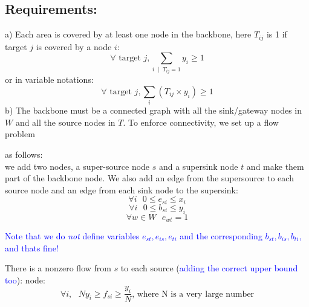 \documentclass[letterpaper, 12pt]{article}
\newcommand{\blue}[1]{\textcolor{blue}{#1}}
\begin{document}
\subsection*{Requirements: }a) Each area is covered by at least one node in the
backbone, here $T_{ij}$ is 1 if target $j$ is covered by a node $i$:
\begin{equation}
	\forall \mbox{ target }j,    \sum_{i \; \mid \; T_{ij} = 1}   y_i   \geq   1
\end{equation}
or in variable notations:
\begin{equation*}
	\forall \mbox{ target }j,    \sum_i   (T_{ij} \times y_i)   \geq   1
\end{equation*}
b) The backbone must be a connected graph with all the sink/gateway nodes in $W$
and all the source nodes in $T$. To enforce connectivity, we set up a flow problem

as follows: \\
\indent we add two nodes, a super-source node $s$ and a supersink node $t$
and make them part of the backbone node. We also add an edge from the supersource to
each source node and an edge from each sink node to the supersink:
\begin{equation}
	\forall i\mbox{ } 0 \leq  e_{si} \leq x_i
\end{equation}
\begin{equation}
	\forall i\mbox{ } 0 \leq b_{si} \leq y_i
\end{equation}
\begin{equation}
 	\forall w \in W\mbox{ } e_{wt} = 1
\end{equation}

\blue{Note that we do {\em not} define variables $e_{st}, e_{is}, e_{ti}$ and the corresponding $b_{st}, b_{is}, b_{ti}$, and thats fine!}

There is a nonzero flow from $s$ to each source (\blue{adding the correct upper bound too}):
node:
\begin{equation}
	\forall i, \mbox{ } N y_i \geq f_{si} \geq \frac{y_{i}}{N} \mbox{, where N is a very large number}
\end{equation}
\end{document}
